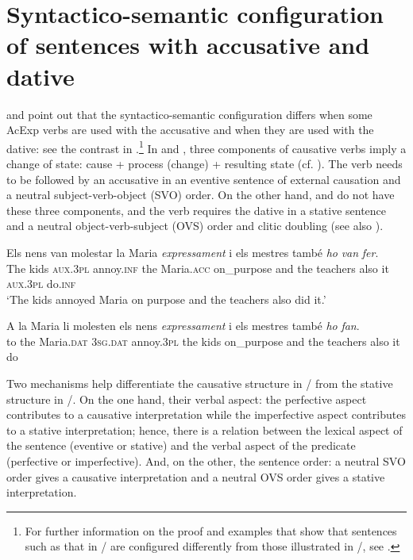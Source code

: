 \documentclass[output=paper,colorlinks,citecolor=brown,modfonts,nonflat]{langsci/langscibook}
\begin{document}
\section{Syntactico-semantic configuration of sentences with accusative and dative}\label{sec:royo:2}

\citet{Ynglès1991} and \citet{CabréMateu1998} point out that the syntactico-semantic configuration differs when some AcExp verbs are used with the accusative and when they are used with the dative: see the contrast in .\footnote{For further information on the proof and examples that show that sentences such as that in  / are configured differently from those illustrated in /, see \citet[Section 4.1]{Royo2017}.} In  and , three components of causative verbs imply a change of state: cause + process (change) + resulting state (cf. \citealt{LevinRappaportHovav1995, CabréMateu1998, Rossello2008}). The verb needs to be followed by an accusative in an eventive sentence of external causation and a neutral subject-verb-object (SVO) order. On the other hand,  and  do not have these three components, and the verb requires the dative in a stative sentence and a neutral object-verb-subject (OVS) order and clitic doubling (see also ).

\ea%
 \label{ex:royo:3}
 \ea \label{ex:royo:3a}
 \gll Els nens van molestar la Maria \emph{expressament} i els mestres també \emph{ho} \emph{van} \emph{fer}. \\
The kids \textsc{aux.3pl} annoy.\textsc{inf} the Maria.\textsc{acc} on\_purpose     and the teachers also     it  \textsc{aux.3pl} do.\textsc{inf}\\
 \glt ‘The kids annoyed Maria on purpose and the teachers also did it.’
 
 \ex \label{ex:royo:3b}
 \gll *A la Maria li molesten els nens \emph{expressament} i els mestres també \emph{ho} \emph{fan}.\\
  to the Maria.\textsc{dat} \textsc{3sg.dat} annoy.\textsc{3pl} the kids on\_purpose     and the teachers also    it   do\\
\glt 
 
 \z
 \z

Two mechanisms help differentiate the causative structure in / from the stative structure in /. On the one hand, their verbal aspect: the perfective aspect contributes to a causative interpretation while the imperfective aspect contributes to a stative interpretation; hence, there is a relation between the lexical aspect of the sentence (eventive or stative) and the verbal aspect of the predicate (perfective or imperfective). And, on the other, the sentence order: a neutral SVO order gives a causative interpretation and a neutral OVS order gives a stative interpretation.
\end{document}
